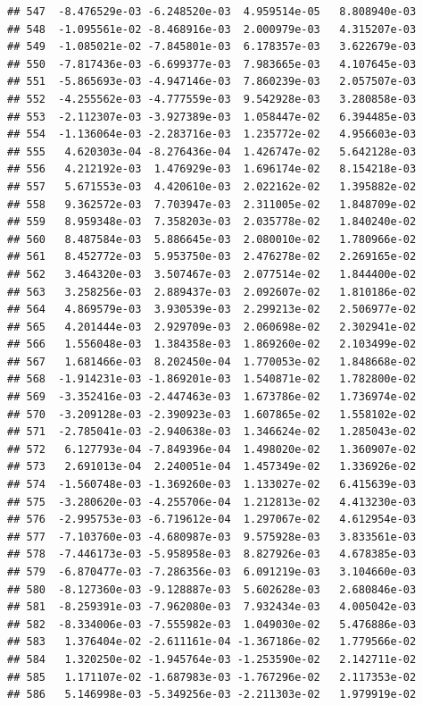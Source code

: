 \documentclass[
]{article}
\begin{document}
\begin{verbatim}
## 547  -8.476529e-03 -6.248520e-03  4.959514e-05   8.808940e-03
## 548  -1.095561e-02 -8.468916e-03  2.000979e-03   4.315207e-03
## 549  -1.085021e-02 -7.845801e-03  6.178357e-03   3.622679e-03
## 550  -7.817436e-03 -6.699377e-03  7.983665e-03   4.107645e-03
## 551  -5.865693e-03 -4.947146e-03  7.860239e-03   2.057507e-03
## 552  -4.255562e-03 -4.777559e-03  9.542928e-03   3.280858e-03
## 553  -2.112307e-03 -3.927389e-03  1.058447e-02   6.394485e-03
## 554  -1.136064e-03 -2.283716e-03  1.235772e-02   4.956603e-03
## 555   4.620303e-04 -8.276436e-04  1.426747e-02   5.642128e-03
## 556   4.212192e-03  1.476929e-03  1.696174e-02   8.154218e-03
## 557   5.671553e-03  4.420610e-03  2.022162e-02   1.395882e-02
## 558   9.362572e-03  7.703947e-03  2.311005e-02   1.848709e-02
## 559   8.959348e-03  7.358203e-03  2.035778e-02   1.840240e-02
## 560   8.487584e-03  5.886645e-03  2.080010e-02   1.780966e-02
## 561   8.452772e-03  5.953750e-03  2.476278e-02   2.269165e-02
## 562   3.464320e-03  3.507467e-03  2.077514e-02   1.844400e-02
## 563   3.258256e-03  2.889437e-03  2.092607e-02   1.810186e-02
## 564   4.869579e-03  3.930539e-03  2.299213e-02   2.506977e-02
## 565   4.201444e-03  2.929709e-03  2.060698e-02   2.302941e-02
## 566   1.556048e-03  1.384358e-03  1.869260e-02   2.103499e-02
## 567   1.681466e-03  8.202450e-04  1.770053e-02   1.848668e-02
## 568  -1.914231e-03 -1.869201e-03  1.540871e-02   1.782800e-02
## 569  -3.352416e-03 -2.447463e-03  1.673786e-02   1.736974e-02
## 570  -3.209128e-03 -2.390923e-03  1.607865e-02   1.558102e-02
## 571  -2.785041e-03 -2.940638e-03  1.346624e-02   1.285043e-02
## 572   6.127793e-04 -7.849396e-04  1.498020e-02   1.360907e-02
## 573   2.691013e-04  2.240051e-04  1.457349e-02   1.336926e-02
## 574  -1.560748e-03 -1.369260e-03  1.133027e-02   6.415639e-03
## 575  -3.280620e-03 -4.255706e-04  1.212813e-02   4.413230e-03
## 576  -2.995753e-03 -6.719612e-04  1.297067e-02   4.612954e-03
## 577  -7.103760e-03 -4.680987e-03  9.575928e-03   3.833561e-03
## 578  -7.446173e-03 -5.958958e-03  8.827926e-03   4.678385e-03
## 579  -6.870477e-03 -7.286356e-03  6.091219e-03   3.104660e-03
## 580  -8.127360e-03 -9.128887e-03  5.602628e-03   2.680846e-03
## 581  -8.259391e-03 -7.962080e-03  7.932434e-03   4.005042e-03
## 582  -8.334006e-03 -7.555982e-03  1.049030e-02   5.476886e-03
## 583   1.376404e-02 -2.611161e-04 -1.367186e-02   1.779566e-02
## 584   1.320250e-02 -1.945764e-03 -1.253590e-02   2.142711e-02
## 585   1.171107e-02 -1.687983e-03 -1.767296e-02   2.117353e-02
## 586   5.146998e-03 -5.349256e-03 -2.211303e-02   1.979919e-02

\end{verbatim}
\end{document}
